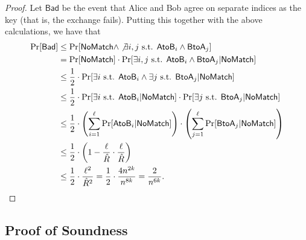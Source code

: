 \begin{proof}
	Let $\mathsf{Bad}$ be the event that Alice and Bob agree on separate indices as the key (that is, the exchange fails). Putting this together with the above calculations, we have that
	\begin{align*}
	\Pr[\mathsf{Bad}] &\le \Pr[\mathsf{NoMatch} \land \not\exists i,j \mbox{ s.t. } \mathsf{AtoB}_i \land \mathsf{BtoA}_j]\\
	&= \Pr[\mathsf{NoMatch}] \cdot \Pr[\exists i,j \mbox{ s.t. } \mathsf{AtoB}_i \land \mathsf{BtoA}_j \vert \mathsf{NoMatch}]\\
	&\le \frac{1}{2} \cdot \Pr[\exists i \mbox{ s.t. } \mathsf{AtoB}_i \land \exists j \mbox{ s.t. } \mathsf{BtoA}_j \vert \mathsf{NoMatch}]\\
	&\le \frac 1 2 \cdot \Pr[\exists i \mbox{ s.t. } \mathsf{AtoB}_i \vert \mathsf{NoMatch}] \cdot \Pr[\exists j \mbox{ s.t. } \mathsf{BtoA}_j \vert \mathsf{NoMatch}]\\
	&\le \frac 1 2 \cdot \left(\sum_{i=1}^\ell \Pr[\mathsf{AtoB}_i \vert \mathsf{NoMatch}]  \right)\cdot 
	\left(\sum_{j=1}^\ell \Pr[\mathsf{BtoA}_j \vert \mathsf{NoMatch}] \right)\\
	&\le \frac 1 2 \cdot \left( 1 - \frac{\ell}{\hat R} \cdot \frac{\ell}{\hat R}
	\right)\\
	&\le \frac{1}{2} \cdot \frac{\ell^2}{\hat R^2} = \frac{1}{2} \cdot \frac{4n^{2k}}{n^{8k}} = \frac{2}{n^{6k}}.
	\end{align*}
\end{proof}


\subsection{Proof of Soundness}

